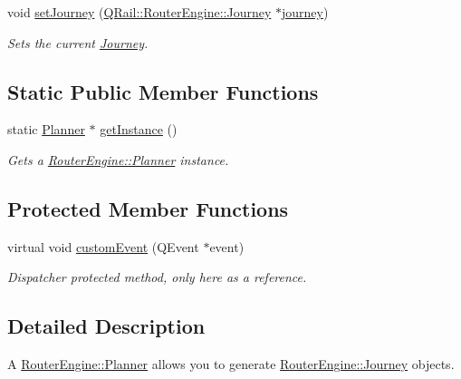 \begin{DoxyCompactItemize}
void \mbox{\hyperlink{classQRail_1_1RouterEngine_1_1Planner_af4aefc8b116590f0641da489e0c8832a}{set\+Journey}} (\mbox{\hyperlink{classQRail_1_1RouterEngine_1_1Journey}{Q\+Rail\+::\+Router\+Engine\+::\+Journey}} $\ast$\mbox{\hyperlink{classQRail_1_1RouterEngine_1_1Planner_af3ae9c83f09d8dadabe6d0e24b22401e}{journey}})
\begin{DoxyCompactList}\small\item\em Sets the current \mbox{\hyperlink{classQRail_1_1RouterEngine_1_1Journey}{Journey}}. \end{DoxyCompactList}\end{DoxyCompactItemize}
\subsection*{Static Public Member Functions}
\begin{DoxyCompactItemize}
\item 
static \mbox{\hyperlink{classQRail_1_1RouterEngine_1_1Planner}{Planner}} $\ast$ \mbox{\hyperlink{classQRail_1_1RouterEngine_1_1Planner_a75095e9f6b6c02097fefef1654bf9b27}{get\+Instance}} ()
\begin{DoxyCompactList}\small\item\em Gets a \mbox{\hyperlink{classQRail_1_1RouterEngine_1_1Planner}{Router\+Engine\+::\+Planner}} instance. \end{DoxyCompactList}\end{DoxyCompactItemize}
\subsection*{Protected Member Functions}
\begin{DoxyCompactItemize}
\item 
virtual void \mbox{\hyperlink{classQRail_1_1RouterEngine_1_1Planner_a2a6a93bae30063f03c439c8761e462fa}{custom\+Event}} (Q\+Event $\ast$event)
\begin{DoxyCompactList}\small\item\em Dispatcher protected method, only here as a reference. \end{DoxyCompactList}\end{DoxyCompactItemize}


\subsection{Detailed Description}
A \mbox{\hyperlink{classQRail_1_1RouterEngine_1_1Planner}{Router\+Engine\+::\+Planner}} allows you to generate \mbox{\hyperlink{classQRail_1_1RouterEngine_1_1Journey}{Router\+Engine\+::\+Journey}} objects. 

